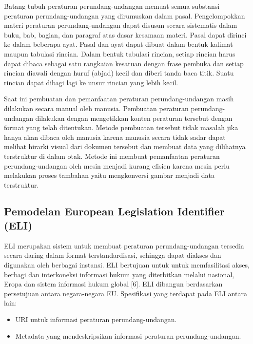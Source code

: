 Batang tubuh peraturan perundang-undangan memuat semua substansi
peraturan perundang-undangan yang dirumuskan dalam pasal. Pengelompokkan
materi peraturan perundang-undangan dapat disusun secara sistematis
dalam buku, bab, bagian, dan paragraf atas dasar kesamaan materi. Pasal
dapat dirinci ke dalam beberapa ayat. Pasal dan ayat dapat dibuat dalam
bentuk kalimat maupun tabulasi rincian. Dalam bentuk tabulasi rincian,
setiap rincian harus dapat dibaca sebagai satu rangkaian kesatuan dengan
frase pembuka dan setiap rincian diawali dengan huruf (abjad) kecil dan
diberi tanda baca titik. Suatu rincian dapat dibagi lagi ke unsur
rincian yang lebih kecil.

Saat ini pembuatan dan pemanfaatan peraturan perundang-undangan masih
dilakukan secara manual oleh manusia. Pembuatan peraturan
perundang-undangan dilakukan dengan mengetikkan konten peraturan
tersebut dengan format yang telah ditentukan. Metode pembuatan tersebut
tidak masalah jika hanya akan dibaca oleh manusia karena manusia secara
tidak sadar dapat melihat hirarki visual dari dokumen tersebut dan
membuat data yang dilihatnya terstruktur di dalam otak. Metode ini
membuat pemanfaatan peraturan perundang-undangan oleh mesin menjadi
kurang efisien karena mesin perlu melakukan proses tambahan yaitu
mengkonversi gambar menjadi data terstruktur.

\subsection{Pemodelan European Legislation Identifier
(ELI)}\label{pemodelan-european-legislation-identifier-eli}

ELI merupakan sistem untuk membuat peraturan perundang-undangan tersedia
secara daring dalam format terstandardisasi, sehingga dapat diakses dan
digunakan oleh berbagai instansi. ELI bertujuan untuk untuk
memfasilitasi akses, berbagi dan interkoneksi informasi hukum yang
diterbitkan melalui nasional, Eropa dan sistem informasi hukum global
{[}6{]}. ELI dibangun berdasarkan persetujuan antara negara-negara EU.
Spesifikasi yang terdapat pada ELI antara lain:

\begin{itemize}
\itemsep1pt\parskip0pt
\item
  URI untuk informasi peraturan perundang-undangan.
\item
  Metadata yang mendeskripsikan informasi peraturan perundang-undangan.
\end{itemize}

